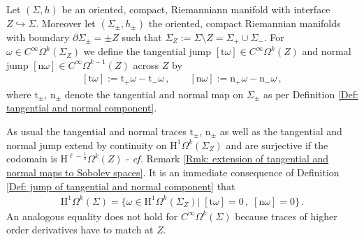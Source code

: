 \begin{Definition}\label{Def: jump of tangential and normal component}
	Let $(\Sigma,h)$ be an oriented, compact, Riemanniann manifold with interface $Z\hookrightarrow\Sigma$.
	Moreover let $(\Sigma_\pm,h_\pm)$ the oriented, compact Riemannian manifolds with boundary $\partial\Sigma_\pm=\pm Z$ such that $\Sigma_Z:=
	\Sigma\setminus Z=\Sigma_+\cup\Sigma_-$.
	For $\omega\in C^\infty\Omega^k(\Sigma_Z)$ we define the tangential jump $[\mathrm{t}\omega]\in C^\infty\Omega^k(Z)$ and normal jump $[\mathrm{n}\omega]\in C^\infty\Omega^{k-1}(Z)$ across $Z$ by
	\begin{align}\label{Eqn: tangential and normal jump}
		[\mathrm{t}\omega]:=\mathrm{t}_+\omega-\mathrm{t}_-\omega\,,\qquad
		[\mathrm{n}\omega]:=\mathrm{n}_+\omega-\mathrm{n}_-\omega\,,
	\end{align}
	where $\mathrm{t}_\pm$, $\mathrm{n}_\pm$ denote the tangential and normal map on $\Sigma_\pm$ as per Definition \ref{Def: tangential and normal component}.
\end{Definition}
\begin{remark}\label{Rmk: spaces with no jumps}
	 As usual the tangential and normal traces $\mathrm{t}_\pm$, $\mathrm{n}_\pm$ as well as the tangential and normal jump extend by continuity on $\mathrm{H}^1\Omega^k(\Sigma_Z)$ and are surjective if the codomain is $\mathrm{H}^{\ell-\frac{1}{2}}\Omega^k(Z)$ - \emph{cf.} Remark \ref{Rmk: extension of tangential and normal maps to Sobolev spaces}. It is an immediate consequence of Definition \ref{Def: jump of tangential and normal component} that
	\begin{align}
		\mathrm{H}^1\Omega^k(\Sigma)=
		\lbrace\omega\in\mathrm{H}^1\Omega^k(\Sigma_Z)|\;[\mathrm{t}\omega]=0\,,\;[\mathrm{n}\omega]=0
		\rbrace\,.
	\end{align}
	An analogous equality does not hold for $C^\infty\Omega^k(\Sigma)$ because traces of higher order derivatives have to match at $Z$.
\end{remark}

